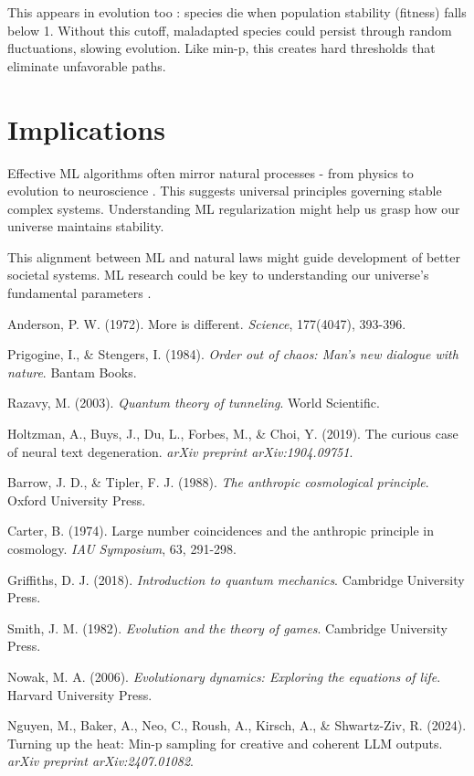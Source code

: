 \documentclass{article}
\begin{document}
This appears in evolution too \cite{maynard1982evolution, nowak2006evolutionary}: species die when population stability (fitness) falls below 1. Without this cutoff, maladapted species could persist through random fluctuations, slowing evolution. Like min-p, this creates hard thresholds that eliminate unfavorable paths.

\section{Implications}
Effective ML algorithms often mirror natural processes - from physics to evolution to neuroscience \cite{anderson1972more}. This suggests universal principles governing stable complex systems. Understanding ML regularization might help us grasp how our universe maintains stability.

This alignment between ML and natural laws might guide development of better societal systems. ML research could be key to understanding our universe's fundamental parameters \cite{carter1974large}.

\begin{thebibliography}{99}
Anderson, P. W. (1972). More is different. \textit{Science}, 177(4047), 393-396.

Prigogine, I., \& Stengers, I. (1984). \textit{Order out of chaos: Man's new dialogue with nature}. Bantam Books.

Razavy, M. (2003). \textit{Quantum theory of tunneling}. World Scientific.

Holtzman, A., Buys, J., Du, L., Forbes, M., \& Choi, Y. (2019). The curious case of neural text degeneration. \textit{arXiv preprint arXiv:1904.09751}.

Barrow, J. D., \& Tipler, F. J. (1988). \textit{The anthropic cosmological principle}. Oxford University Press.

Carter, B. (1974). Large number coincidences and the anthropic principle in cosmology. \textit{IAU Symposium}, 63, 291-298.

Griffiths, D. J. (2018). \textit{Introduction to quantum mechanics}. Cambridge University Press.

Smith, J. M. (1982). \textit{Evolution and the theory of games}. Cambridge University Press.

Nowak, M. A. (2006). \textit{Evolutionary dynamics: Exploring the equations of life}. Harvard University Press.

Nguyen, M., Baker, A., Neo, C., Roush, A., Kirsch, A., \& Shwartz-Ziv, R. (2024). Turning up the heat: Min-p sampling for creative and coherent LLM outputs. \textit{arXiv preprint arXiv:2407.01082}.


\end{thebibliography}
\end{document}
